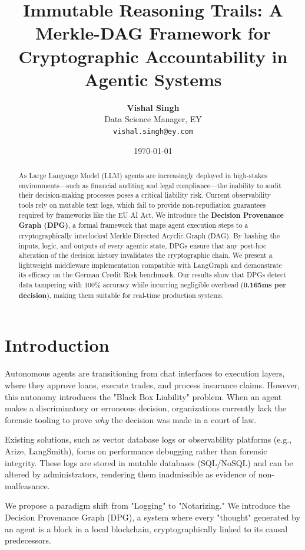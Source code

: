 \documentclass[twocolumn]{article}
\title{\textbf{Immutable Reasoning Trails: A Merkle-DAG Framework for Cryptographic Accountability in Agentic Systems}}
\author{
    \textbf{Vishal Singh} \\
    Data Science Manager, EY \\
    \texttt{vishal.singh@ey.com}
}
\date{\today}
\begin{document}
\maketitle

\begin{abstract}
As Large Language Model (LLM) agents are increasingly deployed in high-stakes environments—such as financial auditing and legal compliance—the inability to audit their decision-making processes poses a critical liability risk. Current observability tools rely on mutable text logs, which fail to provide non-repudiation guarantees required by frameworks like the EU AI Act. We introduce the \textbf{Decision Provenance Graph (DPG)}, a formal framework that maps agent execution steps to a cryptographically interlocked Merkle Directed Acyclic Graph (DAG). By hashing the inputs, logic, and outputs of every agentic state, DPGs ensure that any post-hoc alteration of the decision history invalidates the cryptographic chain. We present a lightweight middleware implementation compatible with LangGraph and demonstrate its efficacy on the German Credit Risk benchmark. Our results show that DPGs detect data tampering with 100\% accuracy while incurring negligible overhead (\textbf{0.165ms per decision}), making them suitable for real-time production systems.
\end{abstract}

\section{Introduction}
Autonomous agents are transitioning from chat interfaces to execution layers, where they approve loans, execute trades, and process insurance claims. However, this autonomy introduces the "Black Box Liability" problem. When an agent makes a discriminatory or erroneous decision, organizations currently lack the forensic tooling to prove \textit{why} the decision was made in a court of law.

Existing solutions, such as vector database logs or observability platforms (e.g., Arize, LangSmith), focus on performance debugging rather than forensic integrity. These logs are stored in mutable databases (SQL/NoSQL) and can be altered by administrators, rendering them inadmissible as evidence of non-malfeasance.

We propose a paradigm shift from "Logging" to "Notarizing." We introduce the Decision Provenance Graph (DPG), a system where every "thought" generated by an agent is a block in a local blockchain, cryptographically linked to its causal predecessors.
\end{document}
